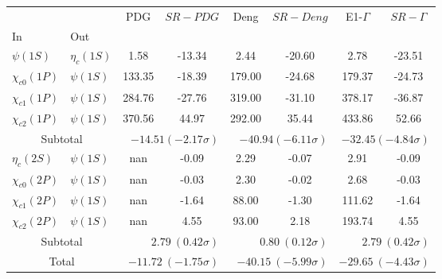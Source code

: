 \begin{tabular}{|l|l|c|c|c|c|c|c|}%
\hline%
&&PDG&$SR-PDG$&Deng&$SR-Deng$&E1-$\Gamma$&$SR-\Gamma$\\%
In&Out&&&&&&\\%
\hline%
$\psi(1S)$&$\eta_{c}(1S)$&1.58&-13.34&2.44&-20.60&2.78&-23.51\\%
$\chi_{c0}(1P)$&$\psi(1S)$&133.35&-18.39&179.00&-24.68&179.37&-24.73\\%
$\chi_{c1}(1P)$&$\psi(1S)$&284.76&-27.76&319.00&-31.10&378.17&-36.87\\%
$\chi_{c2}(1P)$&$\psi(1S)$&370.56&44.97&292.00&35.44&433.86&52.66\\%
\hline%
\hline%
\multicolumn{2}{|c|}{Subtotal}&\multicolumn{2}{|r|}{$-14.51 (-2.17\sigma)$}&\multicolumn{2}{|r|}{$-40.94 (-6.11\sigma)$}&\multicolumn{2}{|r|}{$-32.45 (-4.84\sigma)$}\\%
\hline%
\hline%
$\eta_{c}(2S)$&$\psi(1S)$&nan&-0.09&2.29&-0.07&2.91&-0.09\\%
$\chi_{c0}(2P)$&$\psi(1S)$&nan&-0.03&2.30&-0.02&2.68&-0.03\\%
$\chi_{c1}(2P)$&$\psi(1S)$&nan&-1.64&88.00&-1.30&111.62&-1.64\\%
$\chi_{c2}(2P)$&$\psi(1S)$&nan&4.55&93.00&2.18&193.74&4.55\\%
\hline%
\hline%
\multicolumn{2}{|c|}{Subtotal}&\multicolumn{2}{|r|}{$2.79~(0.42\sigma)$}&\multicolumn{2}{|r|}{$0.80~(0.12\sigma)$}&\multicolumn{2}{|r|}{$2.79~(0.42\sigma)$}\\%
\hline%
\hline%
\multicolumn{2}{|c|}{Total}&\multicolumn{2}{|r|}{$-11.72~(-1.75\sigma)$}&\multicolumn{2}{|r|}{$-40.15~(-5.99\sigma)$}&\multicolumn{2}{|r|}{$-29.65~(-4.43\sigma)$}\\%
\hline%
\end{tabular}